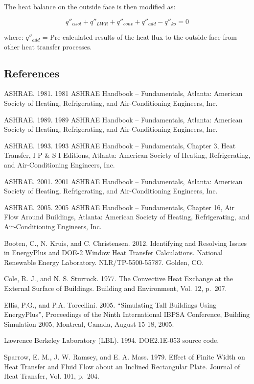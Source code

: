 The heat balance on the outside face is then modified as:

\begin{equation}
{q''_{\alpha sol}} + {q''_{LWR}} + {q''_{conv}} + {q''_{add}} - {q''_{ko}} = 0
\end{equation}

where:
\(q''_{add}\) = Pre-calculated results of the heat flux to the outside face from other heat transfer processes.

\subsection{References}\label{references-1-013}

ASHRAE. 1981. 1981 ASHRAE Handbook -- Fundamentals, Atlanta: American Society of Heating, Refrigerating, and Air-Conditioning Engineers, Inc.

ASHRAE. 1989. 1989 ASHRAE Handbook -- Fundamentals, Atlanta: American Society of Heating, Refrigerating, and Air-Conditioning Engineers, Inc.

ASHRAE. 1993. 1993 ASHRAE Handbook -- Fundamentals, Chapter 3, Heat Transfer, I-P \& S-I Editions, Atlanta: American Society of Heating, Refrigerating, and Air-Conditioning Engineers, Inc.

ASHRAE. 2001. 2001 ASHRAE Handbook -- Fundamentals, Atlanta: American Society of Heating, Refrigerating, and Air-Conditioning Engineers, Inc.

ASHRAE. 2005. 2005 ASHRAE Handbook -- Fundamentals, Chapter 16, Air Flow Around Buildings, Atlanta: American Society of Heating, Refrigerating, and Air-Conditioning Engineers, Inc.

Booten, C., N. Kruis, and C. Christensen. 2012. Identifying and Resolving Issues in EnergyPlus and DOE-2 Window Heat Transfer Calculations. National Renewable Energy Laboratory. NLR/TP-5500-55787. Golden, CO.

Cole, R. J., and N. S. Sturrock. 1977. The Convective Heat Exchange at the External Surface of Buildings. Building and Environment, Vol. 12, p.~207.

Ellis, P.G., and P.A. Torcellini. 2005. ``Simulating Tall Buildings Using EnergyPlus'', Proceedings of the Ninth International IBPSA Conference, Building Simulation 2005, Montreal, Canada, August 15-18, 2005.

Lawrence Berkeley Laboratory (LBL). 1994. DOE2.1E-053 source code.

Sparrow, E. M., J. W. Ramsey, and E. A. Mass. 1979. Effect of Finite Width on Heat Transfer and Fluid Flow about an Inclined Rectangular Plate. Journal of Heat Transfer, Vol. 101, p.~204.

